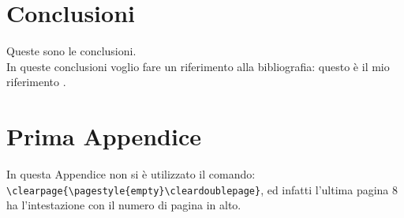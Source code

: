 \documentclass[12pt,a4paper,openright,twoside]{report}
\renewcommand{\chaptermark}[1]{\markboth{\thechapter.\ #1}{}}
\begin{document}
\clearpage{\pagestyle{empty}\cleardoublepage}
\chapter*{Conclusioni}
 Queste sono le
conclusioni.\\
In queste conclusioni voglio fare un riferimento alla
bibliografia: questo \`e il mio riferimento \cite{K3,K4}.
\renewcommand{\chaptermark}[1]{\markright{\thechapter \ #1}{}}
\lhead[\fancyplain{}{\bfseries\thepage}]{\fancyplain{}{\bfseries\rightmark}}
\appendix                               %
\chapter{Prima Appendice}               %
In questa Appendice non si \`e utilizzato il comando:\\
\verb"\clearpage{\pagestyle{empty}\cleardoublepage}", ed infatti
l'ultima pagina 8 ha l'intestazione con il numero di pagina in
alto.
\end{document}
